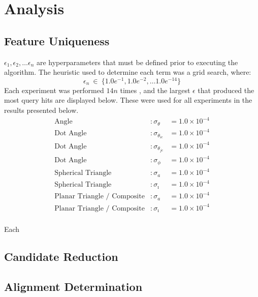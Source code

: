 \section{Analysis}\label{sec:analysis}

\subsection{Feature Uniqueness}\label{subsec:featureUniquenessAnalysis}
$\epsilon_1, \epsilon_2, \ldots \epsilon_n$ are hyperparameters that must be defined prior to executing the algorithm.
The heuristic used to determine each term was a grid search, where:
\begin{equation}
    \label{eq:gridSearchSigma}
    \epsilon_n \ \in \ \{1.0e^{-1}, 1.0e^{-2}, \ldots 1 .0e^{-14}\}
\end{equation}
Each experiment was performed $14n$ times , and the largest $\epsilon$ that produced the most query hits are displayed
below.
These were used for all experiments in the results presented below.
\begin{align*}
    \text{Angle}&: \sigma_\theta &= 1.0 \times 10^{-4}\\
    \text{Dot Angle}&: \sigma_{\theta_{ic}} &= 1.0 \times 10^{-4}\\
    \text{Dot Angle}&: \sigma_{\theta_{jc}} &= 1.0 \times 10^{-4}\\
    \text{Dot Angle}&: \sigma_\phi &= 1.0 \times 10^{-4} \\
    \text{Spherical Triangle}&: \sigma_a &= 1.0 \times 10^{-4}\\
    \text{Spherical Triangle}&: \sigma_\imath &= 1.0 \times 10^{-4}\\
    \text{Planar Triangle / Composite}&: \sigma_a &= 1.0 \times 10^{-4} \\
    \text{Planar Triangle / Composite}&: \sigma_\imath &= 1.0 \times 10^{-4}\\
\end{align*}

Each

\subsection{Candidate Reduction}\label{subsec:candidateReductionAnalysis}

\subsection{Alignment Determination}\label{subsec:alignmentDeterminationAnalysis}